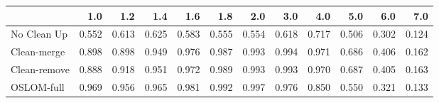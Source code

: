 \begin{tabular}{lrrrrrrrrrrr}
\toprule
{} &   1.0 &   1.2 &   1.4 &   1.6 &   1.8 &   2.0 &   3.0 &   4.0 &   5.0 &   6.0 &   7.0 \\
\midrule
No Clean Up  & 0.552 & 0.613 & 0.625 & 0.583 & 0.555 & 0.554 & 0.618 & 0.717 & 0.506 & 0.302 & 0.124 \\
Clean-merge  & 0.898 & 0.898 & 0.949 & 0.976 & 0.987 & 0.993 & 0.994 & 0.971 & 0.686 & 0.406 & 0.162 \\
Clean-remove & 0.888 & 0.918 & 0.951 & 0.972 & 0.989 & 0.993 & 0.993 & 0.970 & 0.687 & 0.405 & 0.163 \\
OSLOM-full   & 0.969 & 0.956 & 0.965 & 0.981 & 0.992 & 0.997 & 0.976 & 0.850 & 0.550 & 0.321 & 0.133 \\
\bottomrule
\end{tabular}

